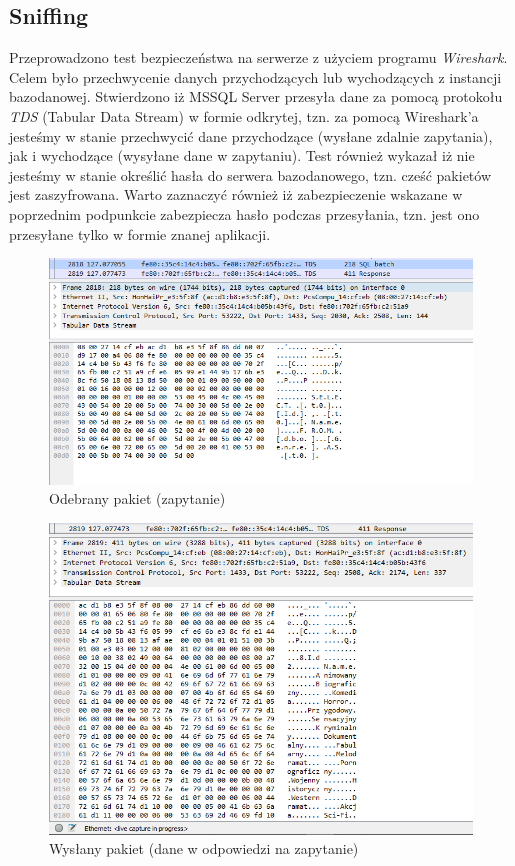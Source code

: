 \documentclass{article}
\begin{document}
\subsection{Sniffing}
Przeprowadzono test bezpieczeństwa na serwerze z użyciem programu \textit{Wireshark}. Celem było przechwycenie danych przychodzących lub wychodzących z instancji bazodanowej. Stwierdzono iż MSSQL Server przesyła dane za pomocą protokołu \textit{TDS} (Tabular Data Stream) w formie odkrytej, tzn. za pomocą Wireshark'a jesteśmy w stanie przechwycić dane przychodzące (wysłane zdalnie zapytania), jak i wychodzące (wysyłane dane w zapytaniu). Test również wykazał iż nie jesteśmy w stanie określić hasła do serwera bazodanowego, tzn. cześć pakietów jest zaszyfrowana. Warto zaznaczyć również iż zabezpieczenie wskazane w poprzednim podpunkcie zabezpiecza hasło podczas przesyłania, tzn. jest ono przesyłane tylko w formie znanej aplikacji. 
\begin{figure}[!ht]
\centering
\includegraphics[width=15cm]{odebrane.PNG}
\caption{Odebrany pakiet (zapytanie)}
\end{figure}
\newpage
\begin{figure}[!h]
\centering
\includegraphics[width=15cm]{wyslane.PNG}
\caption{Wysłany pakiet (dane w odpowiedzi na zapytanie)}
\end{figure}
\end{document}
